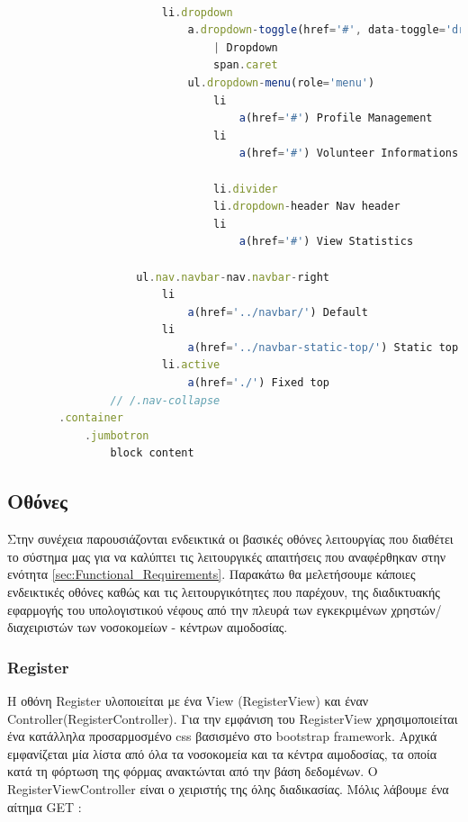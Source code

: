 \begin{lstlisting}[language=Javascript]
						                                                 
                        li.dropdown
                            a.dropdown-toggle(href='#', data-toggle='dropdown')
                                | Dropdown
                                span.caret
                            ul.dropdown-menu(role='menu')
                                li
                                    a(href='#') Profile Management
                                li
                                    a(href='#') Volunteer Informations

                                li.divider
                                li.dropdown-header Nav header
                                li
                                    a(href='#') View Statistics

                    ul.nav.navbar-nav.navbar-right
                        li
                            a(href='../navbar/') Default
                        li
                            a(href='../navbar-static-top/') Static top
                        li.active
                            a(href='./') Fixed top
                // /.nav-collapse
        .container
            .jumbotron
                block content

		\end{lstlisting}

		
	\subsection{Οθόνες}

		Στην συνέχεια παρουσιάζονται ενδεικτικά οι βασικές οθόνες λειτουργίας που διαθέτει το σύστημα μας για να καλύπτει τις λειτουργικές απαιτήσεις που αναφέρθηκαν στην ενότητα \ref{sec:Functional_Requirements}. Παρακάτω θα μελετήσουμε κάποιες ενδεικτικές οθόνες καθώς και τις λειτουργικότητες που παρέχουν, της διαδικτυακής εφαρμογής του υπολογιστικού νέφους από την πλευρά των εγκεκριμένων χρηστών/διαχειριστών των νοσοκομείων - κέντρων αιμοδοσίας. 
	
		\subsubsection{Register}
		
		Η οθόνη Register υλοποιείται με ένα View (RegisterView) και έναν Controller(RegisterController). Για την εμφάνιση του RegisterView χρησιμοποιείται ένα κατάλληλα προσαρμοσμένο css βασισμένο στο bootstrap framework. Αρχικά εμφανίζεται μία λίστα από όλα τα νοσοκομεία και τα κέντρα αιμοδοσίας, τα οποία κατά τη φόρτωση της φόρμας ανακτώνται από την βάση δεδομένων. O RegisterViewController είναι ο χειριστής της όλης διαδικασίας. Μόλις λάβουμε ένα αίτημα GET :
		
